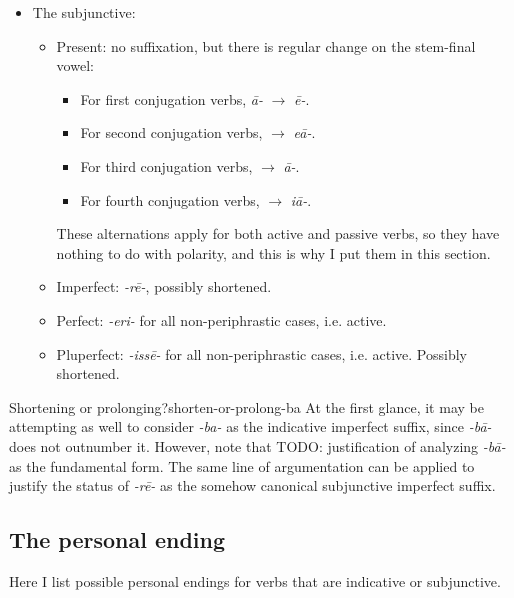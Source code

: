 \documentclass[a4paper, oneside]{report}
\newcommand{\corpus}[1]{\emph{#1}}
\begin{document}
\begin{itemize}
    \item The subjunctive:
    \begin{itemize}
        \item Present: no suffixation, but there is regular change on the stem-final vowel:
        \begin{itemize}
            \item For first conjugation verbs, \corpus{\={a}-} $\to$ \corpus{\={e}-}.
            \item For second conjugation verbs, \corpus{} $\to$ \corpus{e\={a}-}.
            \item For third conjugation verbs, $\to$ \corpus{\={a}-}.
            \item For fourth conjugation verbs, $\to$ \corpus{i\={a}-}.
        \end{itemize}
        These alternations apply for both active and passive verbs,
        so they have nothing to do with polarity, and this is why I put them in this section.
        \item Imperfect: \corpus{-r\={e}-}, possibly shortened.
        \item Perfect: \corpus{-eri-} for all non-periphrastic cases, i.e. active.
        \item Pluperfect: \corpus{-iss\={e}-} for all non-periphrastic cases, i.e. active.
        Possibly shortened.
    \end{itemize}
\end{itemize}

\begin{infobox}{Shortening or prolonging?}{shorten-or-prolong-ba}
    At the first glance, it may be attempting as well to consider \corpus{-ba-} as 
    the indicative imperfect suffix,
    since \corpus{-b\={a}-} does not outnumber it.
    However, note that TODO: justification of analyzing \corpus{-b\={a}-} as the fundamental form.
    The same line of argumentation can be applied to justify the status of \corpus{-r\={e}-}
    as the somehow canonical subjunctive imperfect suffix.
\end{infobox}

\subsection{The personal ending}

Here I list possible personal endings for verbs that are indicative or subjunctive. 
\end{document}
